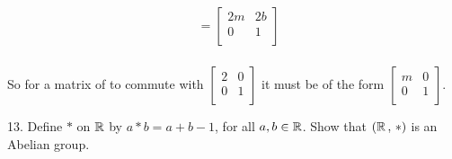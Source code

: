 \begin{mdframed}[style=darkAnswer,frametitle={Joe Starr}]
\begin{multicols}{2}
\begin{align*}
                                  & = \begin{bmatrix}
        2m & 2b \\
        0  & 1  \\
      \end{bmatrix}                             \\
    \end{align*}
  \end{multicols}
  So for a matrix of to commute with $\begin{bmatrix}
      2 & 0 \\
      0 & 1 \\
    \end{bmatrix}$ it must be of the form $\begin{bmatrix}
      m & 0 \\
      0 & 1 \\
    \end{bmatrix}$.
\end{mdframed}
\newpage
\begin{mdframed}[style=darkQuesion]
  13. Define $\ast$ on $\mathbb{R}$ by $a\ast b = a+b-1$, for all $a,b\in \mathbb{R}$. Show that
  $\left(\mathbb{R}\,,\,\ast\right)$ is an Abelian group.
\end{mdframed}

